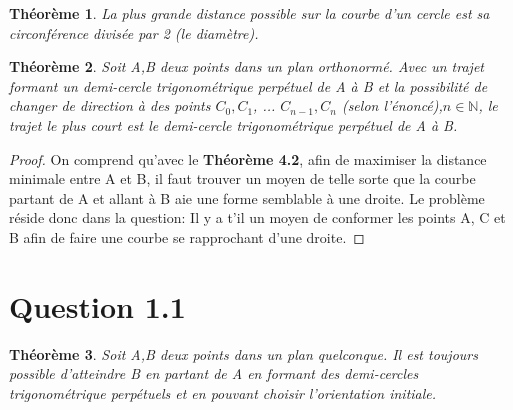 \documentclass{amsart}
\newtheorem{theorem}{Théorème}[section]
\theoremstyle{definition}
\theoremstyle{remark}
\numberwithin{equation}{section}
\begin{document}
\begin{theorem}
  La plus grande distance possible sur la courbe d'un cercle est sa circonférence divisée par 2 (le diamètre).
\end{theorem}

\begin{theorem}
  Soit A,B deux points dans un plan orthonormé. Avec un trajet formant un demi-cercle trigonométrique perpétuel de A à B et la possibilité de changer de direction à des points $C_0, C_1$, ... $C_{n-1}, C_{n}$ (selon l'énoncé),$n\in\mathbb{N}$, le trajet le plus court
  est le demi-cercle trigonométrique perpétuel de A à B.
\end{theorem}

\begin{proof}
  On comprend qu'avec le \textbf{Théorème 4.2}, afin de maximiser la distance minimale entre A et B, il faut trouver un moyen de telle sorte que la courbe partant de A et allant à B aie une forme semblable à une droite. 
  Le problème réside donc dans la question: Il y a t'il un moyen de conformer les points A, C et B afin de faire une courbe se rapprochant d'une droite.
\end{proof}

\section{Question 1.1}

\begin{theorem}
  Soit A,B deux points dans un plan quelconque. Il est toujours possible d'atteindre B en partant de A en formant des demi-cercles trigonométrique perpétuels et en pouvant choisir l'orientation initiale.
\end{theorem}
\end{document}
